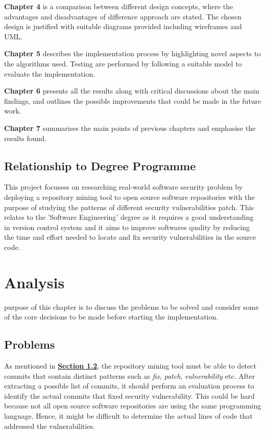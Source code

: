 \documentclass[12pt, a4paper]{report}
\begin{document}
\noindent\textbf{Chapter 4} is a comparison between different design concepts, where the advantages
and disadvantages of difference approach are stated. The chosen design is justified with suitable
diagrams provided including wireframes and UML.

\noindent\textbf{Chapter 5} describes the implementation process by highlighting novel aspects to
the algorithms used. Testing are performed by following a suitable model to evaluate the
implementation.

\noindent\textbf{Chapter 6} presents all the results along with critical discussions about the main
findings,	and outlines the possible improvements that could be made in the future work.

\noindent\textbf{Chapter 7} summarises the main points of previous chapters and emphasise the
results found.

\section{Relationship to Degree Programme}
This project focusses on researching real-world software security problem by deploying a repository
mining tool to open source software repositories with the purpose of studying the patterns of
different security vulnerabilities patch. This relates to the 'Software Engineering' degree as it
requires a good understanding in version control system and it aims to improve softwares quality by
reducing the time and effort needed to locate and fix security vulnerabilities in the source code.

\chapter{Analysis} %
purpose of this chapter is to discuss the problems to be solved and consider some of the core
decisions to be made before starting the implementation.

\section{Problems}
As mentioned in \hyperref[sec:objectives]{\textbf{Section 1.2}}, the repository mining tool must be
able to detect commits that contain distinct patterns such as \textit{fix}, \textit{patch},
\textit{vulnerability} etc. After extracting a possible list of commits, it should perform an
evaluation process to identify the actual commits that fixed security vulnerability.	This could be
hard because not all open source software repositories are using the same programming language.
Hence, it might be difficult to determine the actual lines of code that addressed the
vulnerabilities.
\end{document}

